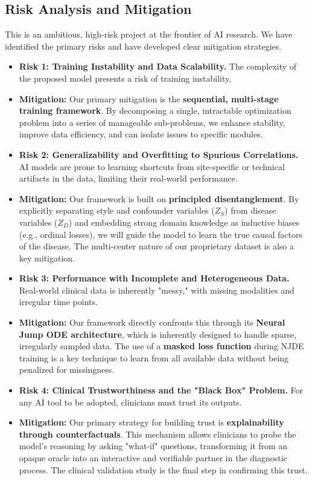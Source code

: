 \documentclass[11pt, a4paper]{article}
\begin{document}
\subsection{Risk Analysis and Mitigation}
This is an ambitious, high-risk project at the frontier of AI research. We have identified the primary risks and have developed clear mitigation strategies.
\begin{itemize}
    \item \textbf{Risk 1: Training Instability and Data Scalability.} The complexity of the proposed model presents a risk of training instability.
    \item \textbf{Mitigation:} Our primary mitigation is the \textbf{sequential, multi-stage training framework}. By decomposing a single, intractable optimization problem into a series of manageable sub-problems, we enhance stability, improve data efficiency, and can isolate issues to specific modules.

    \item \textbf{Risk 2: Generalizability and Overfitting to Spurious Correlations.} AI models are prone to learning shortcuts from site-specific or technical artifacts in the data, limiting their real-world performance.
    \item \textbf{Mitigation:} Our framework is built on \textbf{principled disentanglement}. By explicitly separating style and confounder variables ($Z_S$) from disease variables ($Z_D$) and embedding strong domain knowledge as inductive biases (e.g., ordinal losses), we will guide the model to learn the true causal factors of the disease. The multi-center nature of our proprietary dataset is also a key mitigation.

    \item \textbf{Risk 3: Performance with Incomplete and Heterogeneous Data.} Real-world clinical data is inherently "messy," with missing modalities and irregular time points.
    \item \textbf{Mitigation:} Our framework directly confronts this through its \textbf{Neural Jump ODE architecture}, which is inherently designed to handle sparse, irregularly sampled data. The use of a \textbf{masked loss function} during NJDE training is a key technique to learn from all available data without being penalized for missingness.

    \item \textbf{Risk 4: Clinical Trustworthiness and the "Black Box" Problem.} For any AI tool to be adopted, clinicians must trust its outputs.
    \item \textbf{Mitigation:} Our primary strategy for building trust is \textbf{explainability through counterfactuals}. This mechanism allows clinicians to probe the model's reasoning by asking "what-if" questions, transforming it from an opaque oracle into an interactive and verifiable partner in the diagnostic process. The clinical validation study is the final step in confirming this trust.
\end{itemize}




\end{document}

